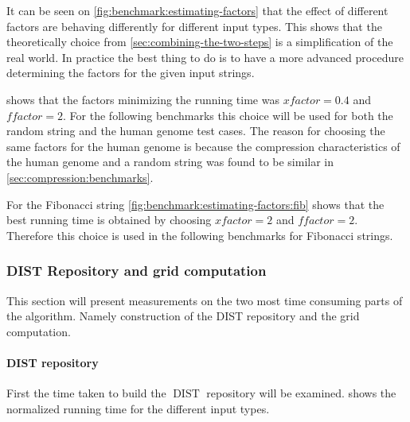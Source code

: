 \documentclass[twoside,11pt,openright]{report}
\newcommand{\DIST}{\operatorname{DIST}}
\begin{document}
It can be seen on \cref{fig:benchmark:estimating-factors} that the effect of different factors are behaving differently for different input types. This shows that the theoretically choice from \cref{sec:combining-the-two-steps} is a simplification of the real world. In practice the best thing to do is to have a more advanced procedure determining the factors for the given input strings.

 shows that the factors minimizing the running time was $xfactor = 0.4$ and $ffactor = 2$. For the following benchmarks this choice will be used for both the random string and the human genome test cases. The reason for choosing the same factors for the human genome is because the compression characteristics of the human genome and a random string was found to be similar in \cref{sec:compression:benchmarks}.

For the Fibonacci string \cref{fig:benchmark:estimating-factors:fib} shows that the best running time is obtained by choosing $xfactor = 2$ and $ffactor = 2$. Therefore this choice is used in the following benchmarks for Fibonacci strings.

\subsubsection{DIST Repository and grid computation}
This section will present measurements on the two most time consuming parts of the algorithm. Namely construction of the DIST repository and the grid computation.

\paragraph{DIST repository}
First the time taken to build the $\DIST$ repository will be examined.  shows the normalized running time for the different input types.

\end{document}

